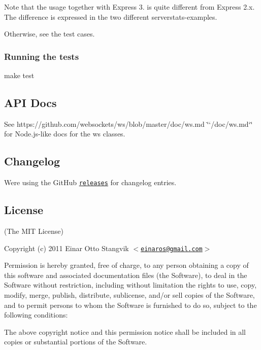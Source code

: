 Note that the usage together with Express 3. is quite different from Express 2.\+x. The difference is expressed in the two different serverstats-\/examples.

Otherwise, see the test cases.

\subsubsection*{Running the tests}


\begin{DoxyCode}
make test
\end{DoxyCode}


\subsection*{A\+PI Docs}

See https\+://github.com/websockets/ws/blob/master/doc/ws.\+md \char`\"{}`/doc/ws.\+md`\char`\"{} for Node.\+js-\/like docs for the ws classes.

\subsection*{Changelog}

We\textquotesingle{}re using the Git\+Hub \href{https://github.com/websockets/ws/releases}{\tt {\ttfamily releases}} for changelog entries.

\subsection*{License}

(The M\+IT License)

Copyright (c) 2011 Einar Otto Stangvik $<$\href{mailto:einaros@gmail.com}{\tt einaros@gmail.\+com}$>$

Permission is hereby granted, free of charge, to any person obtaining a copy of this software and associated documentation files (the \textquotesingle{}Software\textquotesingle{}), to deal in the Software without restriction, including without limitation the rights to use, copy, modify, merge, publish, distribute, sublicense, and/or sell copies of the Software, and to permit persons to whom the Software is furnished to do so, subject to the following conditions\+:

The above copyright notice and this permission notice shall be included in all copies or substantial portions of the Software.

